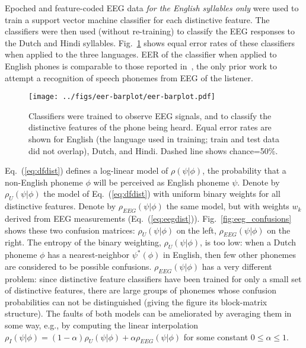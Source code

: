 \label{ssec:eeg}

\newcommand{\specialcell}[2][c]{%
  \begin{tabular}[#1]{@{}c@{}}#2\end{tabular}}

Epoched and feature-coded EEG data {\em for the English syllables
only} were used to train a support vector machine classifier for each
distinctive feature.  The classifiers were then used (without
re-training) to classify the EEG responses to the Dutch and Hindi
syllables.  Fig.~\ref{fig:eeg_svm_eers} shows equal error rates of
these classifiers when applied to the three languages. 
EER of the classifier when applied to English phones is comparable to
those reported in~\cite{Liberto15}, the only prior work to attempt a
recognition of speech phonemes from EEG of the listener.

\begin{figure}
  \centerline{\texttt{[image: ../figs/eer-barplot/eer-barplot.pdf]}}
  \vspace*{-0.3cm}
  \caption{Classifiers were trained to observe EEG signals, and to
    classify the distinctive features of the phone being heard.  Equal
    error rates are shown for English (the language used in training;
    train and test data did not overlap), Dutch, and Hindi.  Dashed
    line shows chance=50\%.}
  \label{fig:eeg_svm_eers}
\end{figure}

Eq.~(\ref{eq:dfdist}) defines a log-linear model of $\rho(\psi|\phi)$,
the probability that a non-English phoneme $\phi$ will be perceived as
English phoneme $\psi$.  Denote by $\rho_U(\psi|\phi)$ the model of
Eq.~(\ref{eq:dfdist}) with uniform binary weights for all distinctive
features. Denote by $\rho_{EEG}(\psi|\phi)$ the same model, but with
weights $w_k$ derived from EEG measurements (Eq.~(\ref{eq:eegdist})).
Fig.~\ref{fig:eeg_confusions} shows these two confusion matrices:
$\rho_U(\psi|\phi)$ on the left, $\rho_{EEG}(\psi|\phi)$ on the
right. The entropy of the binary weighting, $\rho_U(\psi|\phi)$, is
too low: when a Dutch phoneme $\phi$ has a nearest-neighbor
$\psi^*(\phi)$ in English, then few other phonemes are considered to
be possible confusions.  $\rho_{EEG}(\psi|\phi)$ has a very different
problem: since distinctive feature classifiers have been trained for
only a small set of distinctive features, there are large groups of
phonemes whose confusion probabilities can not be distinguished
(giving the figure its block-matrix structure).  The faults of both
models can be ameliorated by averaging them in some way, e.g., by
computing the linear interpolation
$\rho_I(\psi|\phi)=(1-\alpha)\rho_U(\psi|\phi)+\alpha\rho_{EEG}(\psi|\phi)$
for some constant $0\le\alpha\le 1$.


